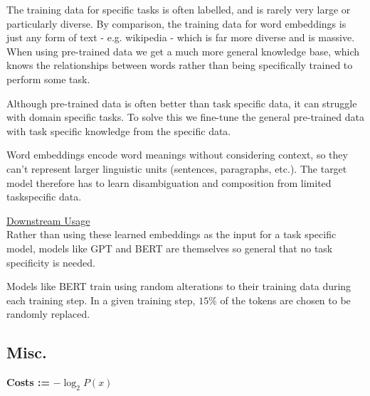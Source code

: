 \documentclass[8pt]{extarticle} %
\begin{document}
\begin{multicols*}{3}
The training data for specific tasks is often labelled, and is rarely very large or particularly diverse. By comparison, the training data for word embeddings is just any form of text - e.g. wikipedia - which is far more diverse and is massive. When using pre-trained data we get a much more general knowledge base, which knows the relationships between words rather than being specifically trained to perform some task.

Although pre-trained data is often better than task specific data, it can struggle with domain specific tasks. To solve this we fine-tune the general pre-trained data with task specific knowledge from the specific data.

Word embeddings encode word meanings without considering context, so they can't represent larger linguistic units (sentences, paragraphs, etc.). The target model therefore has to learn disambiguation and composition from limited taskspecific data.

\underline{Downstream Usage}\\

Rather than using these learned embeddings as the input for a task specific model, models like GPT and BERT are themselves so general that no task specificity is needed.

Models like BERT train using random alterations to their training data during each training step. In a given training step, $15 \%$ of the tokens are chosen to be randomly replaced.

\subsection*{Misc.}
\textbf{Costs :=} $-\log_2 P(x)$\\
\end{multicols*}
\end{document}
